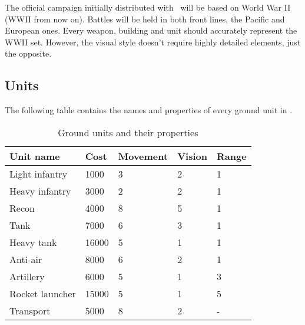 The official campaign initially distributed with \game\ will be based on World
War II (WWII from now on). Battles will be held in both front lines, the Pacific
and European ones. Every weapon, building and unit should accurately represent
the WWII set. However, the visual style doesn't require highly detailed
elements, just the opposite.\\

\subsection{Units}


The following table contains the names and properties of every ground unit in
\game.\\

\begin{table}[H]
    \label{tab:ground-units}
    \begin{center}
    \begin{tabular}{| l | m{1cm} | m{1.7cm} | m{1.0cm} | m{1.5cm} |}
        \hline
        \textbf{Unit name} & \textbf{Cost} & \textbf{Movement} & \textbf{Vision} & \textbf{Range}\\
        \hline
        Light infantry & 1000 & 3 & 2  & 1 \\
        \hline
        Heavy infantry & 3000 & 2 & 2 & 1 \\
        \hline
        Recon & 4000 & 8 & 5 & 1 \\
        \hline
        Tank & 7000 & 6 & 3 & 1 \\
        \hline
        Heavy tank & 16000 & 5 & 1 & 1 \\
        \hline
        Anti-air & 8000 & 6 & 2 & 1 \\
        \hline
        Artillery & 6000 & 5 & 1 & 3 \\
        \hline
        Rocket launcher & 15000 & 5 & 1 & 5 \\
        \hline
        Transport & 5000 & 8 & 2 & - \\
        \hline
    \end{tabular}
    \end{center}
\caption{Ground units and their properties}
\end{table}



